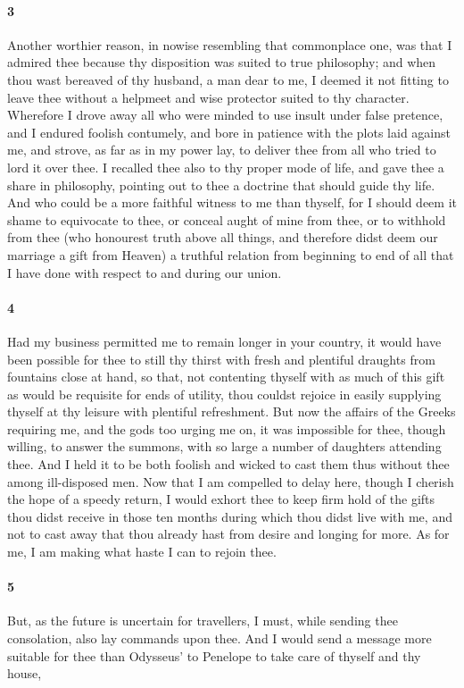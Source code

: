 \documentclass[12pt]{article}
\begin{document}
\paragraph{3} Another worthier reason, in nowise resembling that commonplace
one, was that I admired thee because thy disposition was suited to true
philosophy; and when thou wast bereaved of thy husband, a man dear to me, I
deemed it not fitting to leave thee without a helpmeet and wise protector
suited to thy character. Wherefore I drove away all who were minded to use
insult under false pretence, and I endured foolish contumely, and bore in
patience with the plots laid against me, and strove, as far as in my power lay,
to deliver thee from all who tried to lord it over thee. I recalled thee also
to thy proper mode of life, and gave thee a share in philosophy, pointing out
to thee a doctrine that should guide thy life. And who could be a more faithful
witness to me than thyself, for I should deem it shame to equivocate to thee,
or conceal aught of mine from thee, or to withhold from thee (who honourest
truth above all things, and therefore didst deem our marriage a gift from
Heaven) a truthful relation from beginning to end of all that I have done with
respect to and during our union.

\paragraph{4} Had my business permitted me to remain longer in your country, it
would have been possible for thee to still thy thirst with fresh and plentiful
draughts from fountains close at hand, so that, not contenting thyself with as
much of this gift as would be requisite for ends of utility, thou couldst
rejoice in easily supplying thyself at thy leisure with plentiful refreshment.
But now the affairs of the Greeks requiring me, and the gods too urging me on,
it was impossible for thee, though willing, to answer the summons, with so
large a number of daughters attending thee. And I held it to be both foolish
and wicked to cast them thus without thee among ill-disposed men. Now that I am
compelled to delay here, though I cherish the hope of a speedy return, I would
exhort thee to keep firm hold of the gifts thou didst receive in those ten
months during which thou didst live with me, and not to cast away that thou
already hast from desire and longing for more. As for me, I am making what
haste I can to rejoin thee.

\paragraph{5} But, as the future is uncertain for travellers, I must, while
sending thee consolation, also lay commands upon thee. And I would send a
message more suitable for thee than Odysseus' to Penelope to take care of
thyself and thy house,
\end{document}
